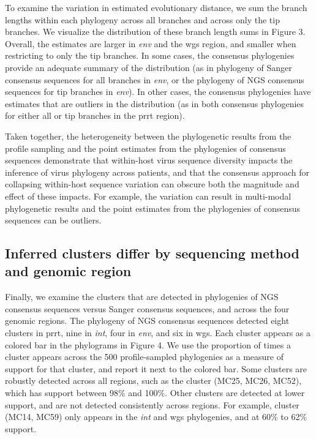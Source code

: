 \documentclass[letterpaper]{article}
\begin{document}
To examine the variation in estimated evolutionary distance, we sum the branch lengths within each phylogeny across all branches and across only the tip branches. We visualize the distribution of these branch length sums in Figure 3. Overall, the estimates are larger in \emph{env} and the wgs region, and smaller when restricting to only the tip branches. In some cases, the consensus phylogenies provide an adequate summary of the distribution (as in phylogeny of Sanger consensus sequences for all branches in \emph{env}, or the phylogeny of NGS consensus sequences for tip branches in \emph{env}). In other cases, the consensus phylogenies have estimates that are outliers in the distribution (as in both consensus phylogenies for either all or tip branches in the prrt region).

Taken together, the heterogeneity between the phylogenetic results from the profile sampling and the point estimates from the phylogenies of consensus sequences demonstrate that within-host virus sequence diversity impacts the inference of virus phylogeny across patients, and that the consensus approach for collapsing within-host sequence variation can obscure both the magnitude and effect of these impacts. For example, the variation can result in multi-modal phylogenetic results and the point estimates from the phylogenies of consensus sequences can be outliers.

\subsection*{Inferred clusters differ by sequencing method and genomic region}

Finally, we examine the clusters that are detected in phylogenies of NGS consensus sequences versus Sanger consensus sequences, and across the four genomic regions. The phylogeny of NGS consensus sequences detected eight clusters in prrt, nine in \emph{int}, four in \emph{env}, and six in wgs. Each cluster appears as a colored bar in the phylograms in Figure 4. We use the proportion of times a cluster appears across the 500 profile-sampled phylogenies as a measure of support for that cluster, and report it next to the colored bar. Some clusters are robustly detected across all regions, such as the cluster (MC25, MC26, MC52), which has support between 98\% and 100\%. Other clusters are detected at lower support, and are not detected consistently across regions. For example, cluster (MC14, MC59) only appears in the \emph{int} and wgs phylogenies, and at 60\% to 62\% support.  
\end{document}
